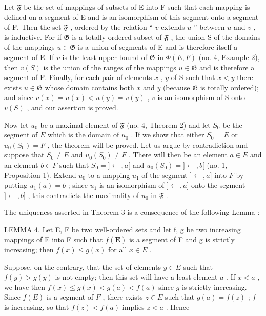 Let \(\mathfrak{F}\) be the set of mappings of subsets of E into F such that each mapping is defined on a segment of E and is an isomorphism of this segment onto a segment of F. Then the set \(\mathfrak{F}\) , ordered by the relation `` \(v\) extends \(u\) '' between \(u\) and \(v\) , is inductive. For if \(\mathfrak{G}\) is a totally ordered subset of \(\mathfrak{F}\) , the union S of the domains of the mappings \(u \in \mathfrak{G}\) is a union of segments of E and is therefore itself a segment of E. If \(v\) is the least upper bound of \(\mathfrak{G}\) in \(\Phi(E, F)\) (no. 4, Example 2), then \(v(S)\) is the union of the ranges of the mappings \(u \in \mathfrak{G}\) and is therefore a segment of F. Finally, for each pair of elements \(x\) , \(y\) of S such that \(x < y\) there exists \(u \in \mathfrak{G}\) whose domain contains both \(x\) and \(y\) (because \(\mathfrak{G}\) is totally ordered); and since \(v(x) = u(x) < u(y) = v(y)\) , \(v\) is an isomorphism of S onto \(v(S)\) , and our assertion is proved.

Now let \(u_0\) be a maximal element of \(\mathfrak{F}\) (no. 4, Theorem 2) and let \(S_0\) be the segment of \(E\) which is the domain of \(u_0\) . If we show that either \(S_0 = E\) or \(u_0(S_0) = F\) , the theorem will be proved. Let us argue by contradiction and suppose that \(S_0 \neq E\) and \(u_0(S_0) \neq F\) . There will then be an element \(a \in E\) and an element \(b \in F\) such that \(S_0 = ]\leftarrow, a[\) and \(u_0(S_0) = ]\leftarrow, b[\) (no. 1, Proposition 1). Extend \(u_0\) to a mapping \(u_1\) of the segment \(]\leftarrow, a]\) into \(F\) by putting \(u_1(a) = b\) ; since \(u_1\) is an isomorphism of \(]\leftarrow, a]\) onto the segment \(]\leftarrow, b]\) , this contradicts the maximality of \(u_0\) in \(\mathfrak{F}\) .

The uniqueness asserted in Theorem 3 is a consequence of the following Lemma :

LEMMA 4. Let E, F be two well-ordered sets and let f, g be two increasing mappings of E into F such that \(f(\mathbf{E})\) is a segment of F and g is strictly increasing; then \(f(x) \leqslant g(x)\) for all \(x \in E\) .

Suppose, on the contrary, that the set of elements \(y \in E\) such that \(f(y) > g(y)\) is not empty; then this set will have a least element \(a\) . If \(x < a\) , we have then \(f(x) \leqslant g(x) < g(a) < f(a)\) since \(g\) is strictly increasing. Since \(f(E)\) is a segment of \(F\) , there exists \(z \in E\) such that \(g(a) = f(z)\) ; \(f\) is increasing, so that \(f(z) < f(a)\) implies \(z < a\) . Hence

